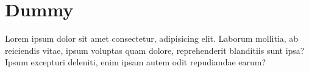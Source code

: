 \section{Dummy}

Lorem ipsum dolor sit amet consectetur, adipisicing elit. Laborum mollitia, ab
reiciendis vitae, ipsum voluptas quam dolore, reprehenderit blanditiis sunt
ipsa? Ipsum excepturi deleniti, enim ipsam autem odit repudiandae earum?